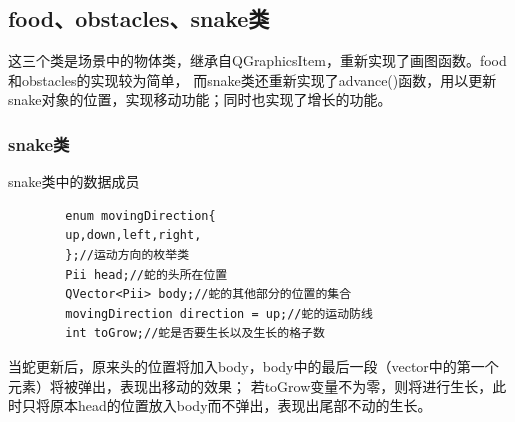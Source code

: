 \documentclass[utf-8]{ctexart}
\begin{document}
    \subsection{food、obstacles、snake类}
    这三个类是场景中的物体类，继承自QGraphicsItem，重新实现了画图函数。food和obstacles的实现较为简单，
    而snake类还重新实现了advance()函数，用以更新snake对象的位置，实现移动功能；同时也实现了增长的功能。
    \subsubsection{snake类}
    snake类中的数据成员
    \begin{lstlisting}
        enum movingDirection{
        up,down,left,right,
        };//运动方向的枚举类
        Pii head;//蛇的头所在位置
        QVector<Pii> body;//蛇的其他部分的位置的集合
        movingDirection direction = up;//蛇的运动防线
        int toGrow;//蛇是否要生长以及生长的格子数
    \end{lstlisting}
    \par 当蛇更新后，原来头的位置将加入body，body中的最后一段（vector中的第一个元素）将被弹出，表现出移动的效果；
    若toGrow变量不为零，则将进行生长，此时只将原本head的位置放入body而不弹出，表现出尾部不动的生长。
\end{document}
